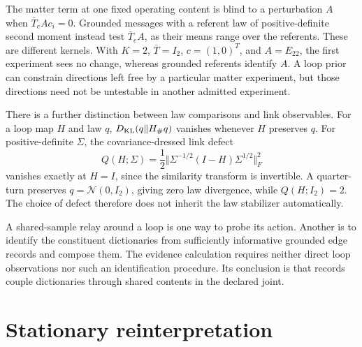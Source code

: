 The matter term at one fixed operating content is blind to a perturbation $A$ when $\bar T_eAc_i=0$. Grounded messages with a referent law of positive-definite second moment instead test $\bar T_eA$, as their means range over the referents. These are different kernels. With $K=2$, $\bar T=I_2$, $c=(1,0)^T$, and $A=E_{22}$, the first experiment sees no change, whereas grounded referents identify $A$. A loop prior can constrain directions left free by a particular matter experiment, but those directions need not be untestable in another admitted experiment.

There is a further distinction between law comparisons and link observables. For a loop map $H$ and law $q$, $D_{\mathrm{KL}}(q\Vert H_\#q)$ vanishes whenever $H$ preserves $q$. For positive-definite $\Sigma$, the covariance-dressed link defect
\begin{equation}
Q(H;\Sigma)=\frac12\Vert\Sigma^{-1/2}(I-H)\Sigma^{1/2}\Vert_F^2
\label{it3:link-defect}
\end{equation}
vanishes exactly at $H=I$, since the similarity transform is invertible. A quarter-turn preserves $q=\mathcal N(0,I_2)$, giving zero law divergence, while $Q(H;I_2)=2$. The choice of defect therefore does not inherit the law stabilizer automatically.

A shared-sample relay around a loop is one way to probe its action. Another is to identify the constituent dictionaries from sufficiently informative grounded edge records and compose them. The evidence calculation requires neither direct loop observations nor such an identification procedure. Its conclusion is that records couple dictionaries through shared contents in the declared joint.

\section{Stationary reinterpretation}
\label{it3:ch-stationary}

